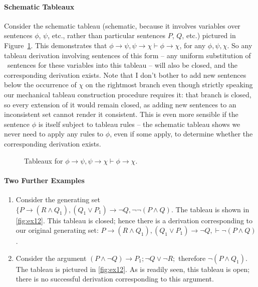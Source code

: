 \paragraph{Schematic Tableaux} Consider the  schematic tableau (schematic, because it involves variables over sentences $\phi$, $\psi$, etc., rather than particular sentences $P$, $Q$, etc.) pictured in Figure~\ref{fig:trans}. This demonstrates that $\phi \to \psi, \psi \to \chi \vdash \phi \to \chi$, for any $\phi,\psi,\chi$. So any tableau derivation involving sentences of this form – any uniform substitution of \lone\ sentences for these variables into this tableau – will also be closed, and the corresponding derivation exists. Note that I don't bother to add new sentences below the occurrence of $\chi$ on the rightmost branch even though strictly speaking our mechanical tableau construction procedure requires it: that branch is closed, so every extension of it would remain closed, as adding new sentences to an inconsistent set cannot render it consistent. This is even more sensible if the sentence $\phi$ is itself subject to tableau rules – the schematic tableau shows we never need to apply any rules to $\phi$, even if some apply, to determine whether the corresponding derivation exists.

\begin{figure}[t]
	\centering 
	{
	\leaf{$\neg \phi$\\$\otimes$}\leaf{$\psi$\\$\otimes$}\leaf{$\chi$\\$\otimes$}
\qobitree	}\caption{Tableaux for $\phi \to \psi, \psi \to \chi \vdash \phi \to \chi$. \label{fig:trans}}
\end{figure}




\paragraph{Two Further  Examples}
\begin{enumerate} \item Consider the generating set $\{P \to (R \wedge Q_{1}), (Q_{1}
\vee P_{1}) \to \neg Q, ¬¬(P \wedge Q)$. The tableau is
shown in \autoref{fig:ex12}. This tableau is closed; hence there is a derivation corresponding to our original generating set: $P \to (R \wedge Q_{1}), (Q_{1}
\vee P_{1}) \to \neg Q, \vdash \neg (P \wedge Q)$ .
\item Consider the argument $(P \wedge \neg Q) \to P_{1}; 
\neg Q \vee \neg R;$ therefore $\neg (P \wedge Q_{1})$. The tableau is
pictured in \autoref{fig:ex12}. As is readily seen, this tableau is open; there is no successful derivation corresponding to this argument. \end{enumerate}

